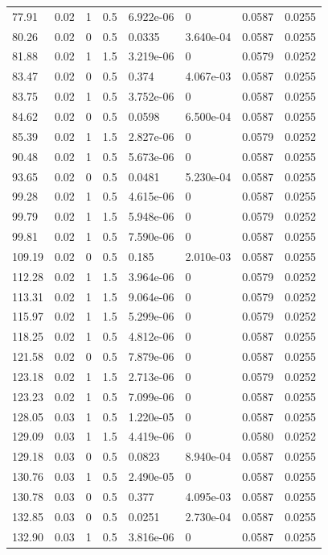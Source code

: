 \documentclass[preview]{standalone}
\begin{document}
{{\begin{tabular}{L{1.2cm}C{1.2cm} C{0.3cm}C{0.5cm} C{1.4cm}C{1.4cm} C{1.4cm}C{1.4cm}}
  77.91  &  0.02  & 1     & 0.5 &  6.922e-06  & 0  & 0.0587 &  0.0255   \\ 
  80.26  &  0.02  & 0     & 0.5 &  0.0335  & 3.640e-04  & 0.0587 &  0.0255   \\ 
  81.88  &  0.02  & 1     & 1.5 &  3.219e-06  & 0  & 0.0579 &  0.0252   \\ 
  83.47  &  0.02  & 0     & 0.5 &  0.374  & 4.067e-03  & 0.0587 &  0.0255   \\ 
  83.75  &  0.02  & 1     & 0.5 &  3.752e-06  & 0  & 0.0587 &  0.0255   \\ 
  84.62  &  0.02  & 0     & 0.5 &  0.0598  & 6.500e-04  & 0.0587 &  0.0255   \\ 
  85.39  &  0.02  & 1     & 1.5 &  2.827e-06  & 0  & 0.0579 &  0.0252   \\ 
  90.48  &  0.02  & 1     & 0.5 &  5.673e-06  & 0  & 0.0587 &  0.0255   \\ 
  93.65  &  0.02  & 0     & 0.5 &  0.0481  & 5.230e-04  & 0.0587 &  0.0255   \\ 
  99.28  &  0.02  & 1     & 0.5 &  4.615e-06  & 0  & 0.0587 &  0.0255   \\ 
  99.79  &  0.02  & 1     & 1.5 &  5.948e-06  & 0  & 0.0579 &  0.0252   \\ 
  99.81  &  0.02  & 1     & 0.5 &  7.590e-06  & 0  & 0.0587 &  0.0255   \\ 
  109.19  &  0.02  & 0     & 0.5 &  0.185  & 2.010e-03  & 0.0587 &  0.0255   \\ 
  112.28  &  0.02  & 1     & 1.5 &  3.964e-06  & 0  & 0.0579 &  0.0252   \\ 
  113.31  &  0.02  & 1     & 1.5 &  9.064e-06  & 0  & 0.0579 &  0.0252   \\ 
  115.97  &  0.02  & 1     & 1.5 &  5.299e-06  & 0  & 0.0579 &  0.0252   \\ 
  118.25  &  0.02  & 1     & 0.5 &  4.812e-06  & 0  & 0.0587 &  0.0255   \\ 
  121.58  &  0.02  & 0     & 0.5 &  7.879e-06  & 0  & 0.0587 &  0.0255   \\ 
  123.18  &  0.02  & 1     & 1.5 &  2.713e-06  & 0  & 0.0579 &  0.0252   \\ 
  123.23  &  0.02  & 1     & 0.5 &  7.099e-06  & 0  & 0.0587 &  0.0255   \\ 
  128.05  &  0.03  & 1     & 0.5 &  1.220e-05  & 0  & 0.0587 &  0.0255   \\ 
  129.09  &  0.03  & 1     & 1.5 &  4.419e-06  & 0  & 0.0580 &  0.0252   \\ 
  129.18  &  0.03  & 0     & 0.5 &  0.0823  & 8.940e-04  & 0.0587 &  0.0255   \\ 
  130.76  &  0.03  & 1     & 0.5 &  2.490e-05  & 0  & 0.0587 &  0.0255   \\ 
  130.78  &  0.03  & 0     & 0.5 &  0.377  & 4.095e-03  & 0.0587 &  0.0255   \\ 
  132.85  &  0.03  & 0     & 0.5 &  0.0251  & 2.730e-04  & 0.0587 &  0.0255   \\ 
  132.90  &  0.03  & 1     & 0.5 &  3.816e-06  & 0  & 0.0587 &  0.0255   \\ 
\hline 
\end{tabular} 

}}
\end{document}

